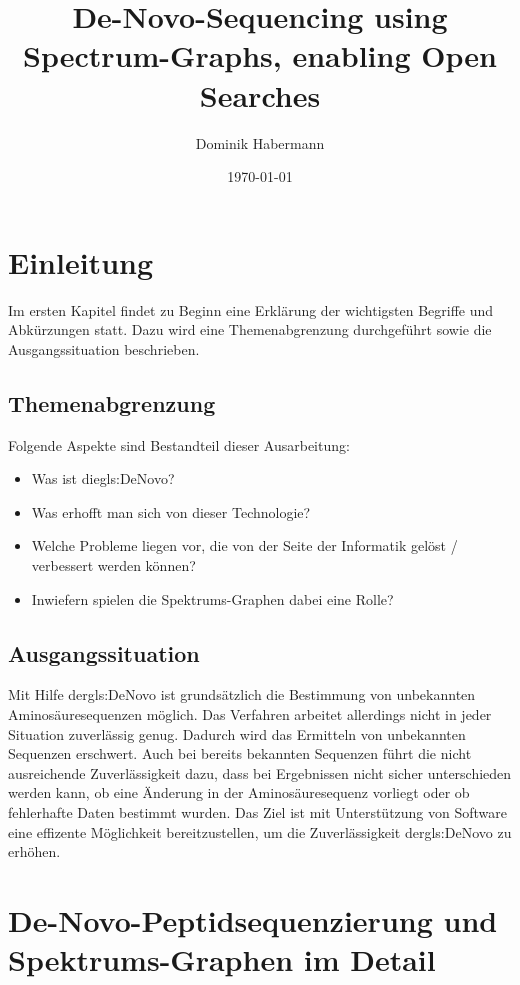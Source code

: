 \documentclass[a4paper, 12pt]{article}
\title{De-Novo-Sequencing using Spectrum-Graphs, enabling Open Searches}
\author{Dominik Habermann}
\date{\today}
\begin{document}
\maketitle

\section{Einleitung}
Im ersten Kapitel findet zu Beginn eine Erklärung der wichtigsten Begriffe und Abkürzungen statt. Dazu wird eine Themenabgrenzung durchgeführt sowie die Ausgangssituation beschrieben.

\printnoidxglossaries

\subsection{Themenabgrenzung}
Folgende Aspekte sind Bestandteil dieser Ausarbeitung:
\begin{itemize}
   \item Was ist die\gls{gls:DeNovo}?
   \item Was erhofft man sich von dieser Technologie?
   \item Welche Probleme liegen vor, die von der Seite der Informatik gelöst / verbessert werden können?
   \item Inwiefern spielen die Spektrums-Graphen dabei eine Rolle?
\end{itemize}

\subsection{Ausgangssituation}
Mit Hilfe der\gls{gls:DeNovo} ist grundsätzlich die Bestimmung von unbekannten Aminosäuresequenzen möglich. Das Verfahren arbeitet allerdings nicht in jeder Situation zuverlässig genug. Dadurch wird das Ermitteln von unbekannten Sequenzen erschwert. Auch bei bereits bekannten Sequenzen führt die nicht ausreichende Zuverlässigkeit dazu, dass bei Ergebnissen nicht sicher unterschieden werden kann, ob eine Änderung in der Aminosäuresequenz vorliegt oder ob fehlerhafte Daten bestimmt wurden.
Das Ziel ist mit Unterstützung von Software eine effizente Möglichkeit bereitzustellen, um die Zuverlässigkeit der\gls{gls:DeNovo} zu erhöhen. 



\section{De-Novo-Peptidsequenzierung und Spektrums-Graphen im Detail}
\end{document}
